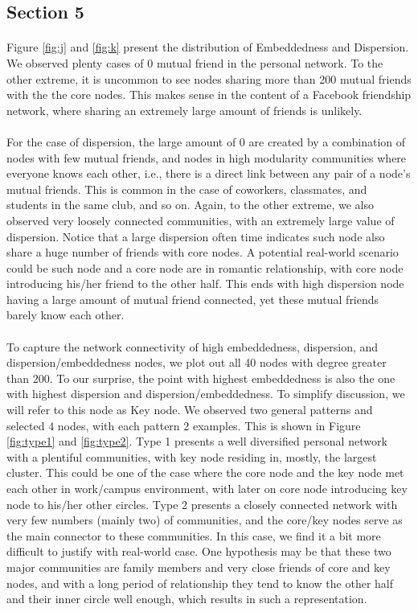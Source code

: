 \newpage
\subsection*{Section 5}
\paragraph{}
Figure \ref{fig:j} and \ref{fig:k} present the distribution of Embeddedness and Dispersion. We observed plenty cases of 0 mutual friend in the personal network. To the other extreme, it is uncommon to see nodes sharing more than 200 mutual friends with the the core nodes. This makes sense in the content of a Facebook friendship network, where sharing an extremely large amount of friends is unlikely. 
\paragraph{}
For the case of dispersion, the large amount of 0 are created by a combination of nodes with few mutual friends, and nodes in high modularity communities where everyone knows each other, i.e., there is a direct link between any pair of a node's mutual friends. This is common in the case of coworkers, classmates, and students in the same club, and so on. Again, to the other extreme, we also observed very loosely connected communities, with an extremely large value of dispersion. Notice that a large dispersion often time indicates such node also share a huge number of friends with core nodes. A potential real-world scenario could be such node and a core node are in romantic relationship, with core node introducing his/her friend to the other half. This ends with high dispersion node having a large amount of mutual friend connected, yet these mutual friends barely know each other.
\paragraph{}
To capture the network connectivity of high embeddedness, dispersion, and dispersion/embeddedness nodes, we plot out all 40 nodes with degree greater than 200. To our surprise, the point with highest embeddedness is also the one with highest dispersion and dispersion/embeddedness. To simplify discussion, we will refer to this node as Key node. We observed two general patterns and selected 4 nodes, with each pattern 2 examples. This is shown in Figure \ref{fig:type1} and \ref{fig:type2}. Type 1 presents a well diversified personal network with a plentiful communities, with key node residing in, mostly, the largest cluster. This could be one of the case where the core node and the key node met each other in work/campus environment, with later on core node introducing key node to his/her other circles. Type 2 presents a closely connected network with very few numbers (mainly two) of communities, and the core/key nodes serve as the main connector to these communities. In this case, we find it a bit more difficult to justify with real-world case. One hypothesis may be that these two major communities are family members and very close friends of core and key nodes, and with a long period of relationship they tend to know the other half and their inner circle well enough, which results in such a representation. 

